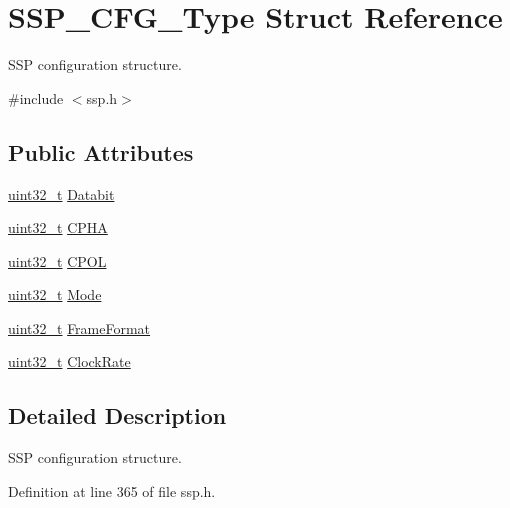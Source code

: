 \hypertarget{struct_s_s_p___c_f_g___type}{}\section{S\+S\+P\+\_\+\+C\+F\+G\+\_\+\+Type Struct Reference}
\label{struct_s_s_p___c_f_g___type}


S\+SP configuration structure.  




{\ttfamily \#include $<$ssp.\+h$>$}

\subsection*{Public Attributes}
\begin{DoxyCompactItemize}
\item 
\hyperlink{_p_e___types_8h_a33594304e786b158f3fb30289278f5af}{uint32\+\_\+t} \hyperlink{struct_s_s_p___c_f_g___type_a7b8cea10875f517ef0af31f82bd1c51a}{Databit}
\item 
\hyperlink{_p_e___types_8h_a33594304e786b158f3fb30289278f5af}{uint32\+\_\+t} \hyperlink{struct_s_s_p___c_f_g___type_af34662ac679b1c7329ed644a749dd2da}{C\+P\+HA}
\item 
\hyperlink{_p_e___types_8h_a33594304e786b158f3fb30289278f5af}{uint32\+\_\+t} \hyperlink{struct_s_s_p___c_f_g___type_ac808d0a31a64e1e8ba7a83029cdf7241}{C\+P\+OL}
\item 
\hyperlink{_p_e___types_8h_a33594304e786b158f3fb30289278f5af}{uint32\+\_\+t} \hyperlink{struct_s_s_p___c_f_g___type_a1d6f2a353259308dd2f289b88a59742a}{Mode}
\item 
\hyperlink{_p_e___types_8h_a33594304e786b158f3fb30289278f5af}{uint32\+\_\+t} \hyperlink{struct_s_s_p___c_f_g___type_acaeda2f05cde2ca11a630a953bbfe852}{Frame\+Format}
\item 
\hyperlink{_p_e___types_8h_a33594304e786b158f3fb30289278f5af}{uint32\+\_\+t} \hyperlink{struct_s_s_p___c_f_g___type_a00f744e032746b5b107556a9d7094c4a}{Clock\+Rate}
\end{DoxyCompactItemize}


\subsection{Detailed Description}
S\+SP configuration structure. 

Definition at line 365 of file ssp.\+h.



